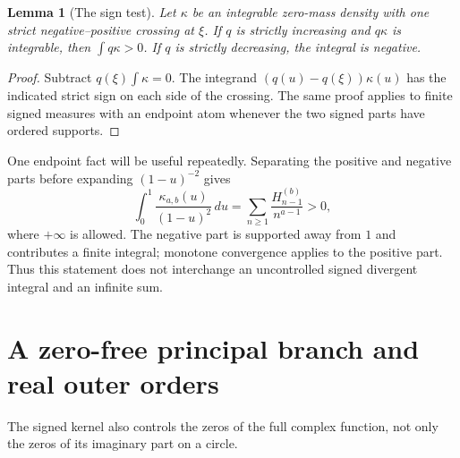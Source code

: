 \documentclass[11pt]{article}
\numberwithin{equation}{section}
\theoremstyle{plain}
\newtheorem{lemma}[theorem]{Lemma}
\theoremstyle{definition}
\theoremstyle{remark}
\begin{document}
\begin{lemma}[The sign test]\label{lem:sign-test}
Let $\kappa$ be an integrable zero-mass density with one strict
negative--positive crossing at $\xi$. If $q$ is strictly increasing and
$q\kappa$ is integrable, then $\int q\kappa>0$. If $q$ is strictly
decreasing, the integral is negative.
\end{lemma}
\begin{proof}
Subtract $q(\xi)\int\kappa=0$. The integrand
$(q(u)-q(\xi))\kappa(u)$ has the indicated strict sign on each side of
the crossing. The same proof applies to finite signed measures with an
endpoint atom whenever the two signed parts have ordered supports.
\end{proof}

One endpoint fact will be useful repeatedly. Separating the positive
and negative parts before expanding $(1-u)^{-2}$ gives
\begin{equation}\label{eq:positive-endpoint}
 \int_0^1\frac{\kappa_{a,b}(u)}{(1-u)^2}\,du
 =\sum_{n\ge1}\frac{H_{n-1}^{(b)}}{n^{a-1}}>0,
\end{equation}
where $+\infty$ is allowed. The negative part is supported away from
$1$ and contributes a finite integral; monotone convergence applies
to the positive part. Thus this statement does not interchange an
uncontrolled signed divergent integral and an infinite sum.


\section{A zero-free principal branch and real outer orders}

The signed kernel also controls the zeros of the full complex function,
not only the zeros of its imaginary part on a circle.
\end{document}
